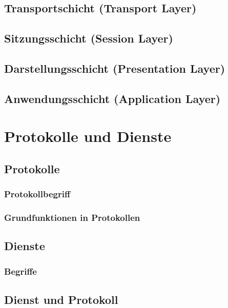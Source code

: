 \subsection{Transportschicht (Transport Layer)}
\subsection{Sitzungsschicht (Session Layer)}
\subsection{Darstellungsschicht (Presentation Layer)}
\subsection{Anwendungsschicht (Application Layer)}

\section{Protokolle und Dienste}
\subsection{Protokolle}
\subsubsection{Protokollbegriff}
\subsubsection{Grundfunktionen in Protokollen}
\subsection{Dienste}
\subsubsection{Begriffe}
\subsection{Dienst und Protokoll}
